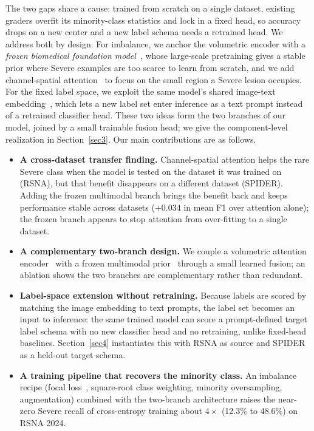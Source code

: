 \documentclass[runningheads]{llncs}
\begin{document}
The two gaps share a cause: trained from scratch on a single dataset, existing graders overfit its minority-class statistics and lock in a fixed head, so accuracy drops on a new center and a new label schema needs a retrained head. We address both by design. For imbalance, we anchor the volumetric encoder with a \emph{frozen biomedical foundation model}~\cite{zhang2023biomedclip}, whose large-scale pretraining gives a stable prior where Severe examples are too scarce to learn from scratch, and we add channel-spatial attention~\cite{woo2018cbam} to focus on the small region a Severe lesion occupies. For the fixed label space, we exploit the same model's shared image-text embedding~\cite{radford2021clip}, which lets a new label set enter inference as a text prompt instead of a retrained classifier head. These two ideas form the two branches of our model, joined by a small trainable fusion head; we give the component-level realization in Section~\ref{sec3}. Our main contributions are as follows.
\begin{itemize}
    \item \textbf{A cross-dataset transfer finding.} Channel-spatial attention helps the rare Severe class when the model is tested on the dataset it was trained on (RSNA), but that benefit disappears on a different dataset (SPIDER). Adding the frozen multimodal branch brings the benefit back and keeps performance stable across datasets ($+0.034$ in mean F1 over attention alone); the frozen branch appears to stop attention from over-fitting to a single dataset.
    \item \textbf{A complementary two-branch design.} We couple a volumetric attention encoder~\cite{woo2018cbam} with a frozen multimodal prior~\cite{zhang2023biomedclip} through a small learned fusion; an ablation shows the two branches are complementary rather than redundant.
    \item \textbf{Label-space extension without retraining.} Because labels are scored by matching the image embedding to text prompts, the label set becomes an input to inference: the same trained model can score a prompt-defined target label schema with no new classifier head and no retraining, unlike fixed-head baselines. Section~\ref{sec4} instantiates this with RSNA as source and SPIDER as a held-out target schema.
    \item \textbf{A training pipeline that recovers the minority class.} An imbalance recipe (focal loss~\cite{lin2017focal}, square-root class weighting, minority oversampling, augmentation) combined with the two-branch architecture raises the near-zero Severe recall of cross-entropy training about $4\times$ (12.3\% to 48.6\%) on RSNA 2024.
\end{itemize}
\end{document}
